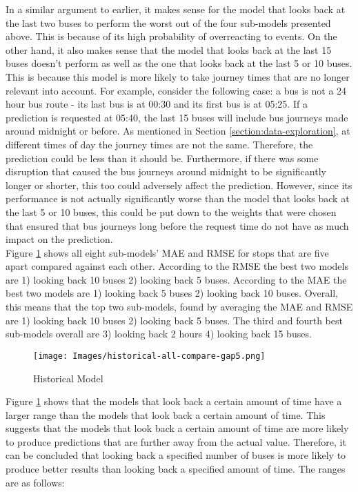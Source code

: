 In a similar argument to earlier, it makes sense for the model that looks back at the last two buses to perform the worst out of the four sub-models presented above. This is because of its high probability of overreacting to events. On the other hand, it also makes sense that the model that looks back at the last 15 buses doesn't perform as well as the one that looks back at the last 5 or 10 buses. This is because this model is more likely to take journey times that are no longer relevant into account. For example, consider the following case: a bus is not a 24 hour bus route - its last bus is at 00:30 and its first bus is at 05:25. If a prediction is requested at 05:40, the last 15 buses will include bus journeys made around midnight or before. As mentioned in Section \ref{section:data-exploration}, at different times of day the journey times are not the same. Therefore, the prediction could be less than it should be. Furthermore, if there was some disruption that caused the bus journeys around midnight to be significantly longer or shorter, this too could adversely affect the prediction. However, since its performance is not actually significantly worse than the model that looks back at the last 5 or 10 buses, this could be put down to the weights that were chosen that ensured that bus journeys long before the request time do not have as much impact on the prediction. \\

Figure \ref{fig:historical-gap5-all-compare} shows all eight sub-models' MAE and RMSE for stops that are five apart compared against each other. According to the RMSE the best two models are 1) looking back 10 buses 2) looking back 5 buses. According to the MAE the best two models are 1) looking back 5 buses 2) looking back 10 buses. Overall, this means that the top two sub-models, found by averaging the MAE and RMSE are 1) looking back 10 buses 2) looking back 5 buses. The third and fourth best sub-models overall are 3) looking back 2 hours 4) looking back 15 buses. 

\begin{figure}[H]
\begin{center}
    \texttt{[image: Images/historical-all-compare-gap5.png]}
    \caption{Historical Model}
    \label{fig:historical-gap5-all-compare}
\end{center}
\end{figure}

Figure \ref{fig:historical-gap5-all-compare} shows that the models that look back a certain amount of time have a larger range than the models that look back a certain amount of time. This suggests that the models that look back a certain amount of time are more likely to produce predictions that are further away from the actual value. Therefore, it can be concluded that looking back a specified number of buses is more likely to produce better results than looking back a specified amount of time. The ranges are as follows:

